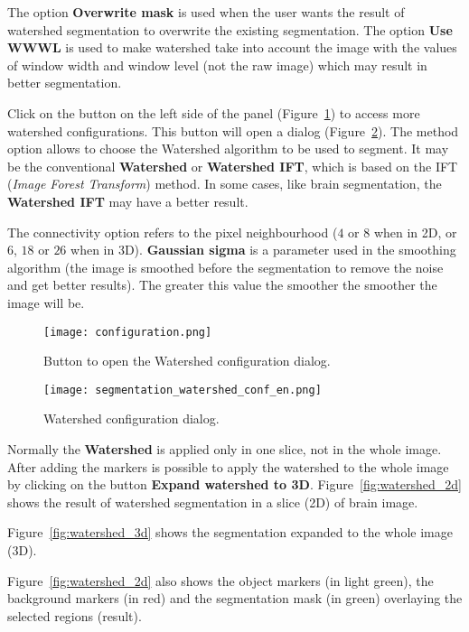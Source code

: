 The option \textbf{Overwrite mask} is used when the user wants the result of watershed segmentation to overwrite the existing segmentation. The option \textbf{Use WWWL} is used to make watershed take into account the image with the values of window width and window level (not the raw image) which may result in better segmentation.

Click on the button on the left side of the panel (Figure~\ref{fig:watershed_conf}) to access more watershed configurations. This button will open a dialog (Figure~\ref{fig:watershed_janela_conf}). The method option allows to choose the Watershed algorithm to be used to segment. It may be the conventional \textbf{Watershed} or \textbf{Watershed IFT}, which is based on the IFT (\textit{Image Forest Transform}) method. In some cases, like brain segmentation, the \textbf{Watershed IFT} may have a better result.

The connectivity option refers to the pixel neighbourhood ($4$ or $8$ when in 2D,  or $6$, $18$ or $26$ when in 3D). \textbf{Gaussian sigma} is a parameter used in the smoothing algorithm (the image is smoothed before the segmentation to remove the noise and get better results). The greater this value the smoother the smoother the image will be.

\begin{figure}[!htb]
    \centering
    \texttt{[image: configuration.png]}
    \caption{Button to open the Watershed configuration dialog.}
    \label{fig:watershed_conf}
\end{figure}

\begin{figure}[!htb]
    \centering
    \texttt{[image: segmentation\_watershed\_conf\_en.png]}
    \caption{Watershed configuration dialog.}
    \label{fig:watershed_janela_conf}
\end{figure}

Normally the \textbf{Watershed} is applied only in one slice, not in the whole image. After adding the markers is possible to apply the watershed to the whole image by clicking on the button \textbf{Expand watershed to 3D}. Figure~\ref{fig:watershed_2d} shows the result of watershed segmentation in a slice (2D) of brain image. 

Figure~\ref{fig:watershed_3d} shows the segmentation expanded to the whole image (3D).

Figure~\ref{fig:watershed_2d} also shows the object markers (in light green), the background markers (in red) and the segmentation mask (in green) overlaying the selected regions (result).

